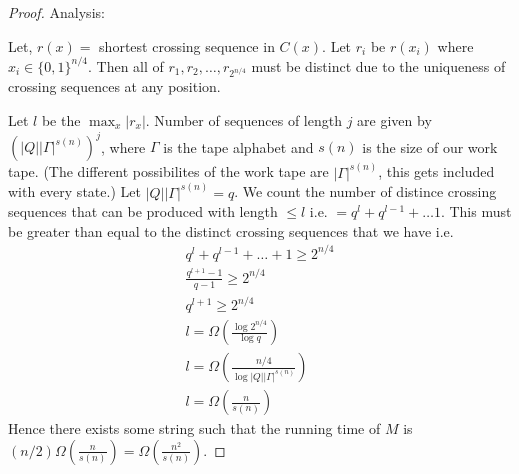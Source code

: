 \documentclass[solution,addpoints,12pt]{exam}
\begin{document}
\begin{questions}
\begin{solution}
\begin{proof}
		Analysis:
		
		Let, $r(x) = $ shortest crossing sequence in $C(x)$. Let $r_i$ be $r(x_i)$ where $x_i \in \{0,1\}^{n/4}$.
		Then all of $r_1,r_2,\ldots,r_{2^{n/4}}$ must be distinct due to the uniqueness of crossing sequences at any position.
		
		Let $l$ be the $\max_x|r_x|$. Number of sequences of length $j$ are given by $(|Q||\Gamma|^{s(n)})^j$, where $\Gamma$ is the tape alphabet and $s(n)$ is the size of our work tape. (The different possibilites of the work tape are $|\Gamma|^{s(n)}$, this gets included with every state.) 
		Let $|Q||\Gamma|^{s(n)} = q$. We count the number of distince crossing sequences that can be produced with length $\leq l$ i.e. $ = q^l + q^{l-1} + \ldots 1$. This must be greater than equal to the distinct crossing sequences that we have i.e.
		\begin{align*}
			q^l + q^{l-1} + \ldots + 1 \geq 2^{n/4}
			\\
			\frac{q^{l+1} - 1}{q-1} \geq 2^{n/4}
			\\
			q^{l+1} \geq 2^{n/4}
			\\
			l = \Omega(\frac{\log {2^{n/4}}}{\log q})
			\\
			l = \Omega(\frac{n/4}{\log |Q||\Gamma|^{s(n)}})
			\\
			l = \Omega(\frac{n}{s(n)})
		\end{align*}   
		Hence there exists some string such that the running time of $M$ is $(n/2)\Omega(\frac{n}{s(n)}) = \Omega(\frac{n^2}{s(n)})$.
	\end{proof}
\end{solution}
\end{questions}
\end{document}
